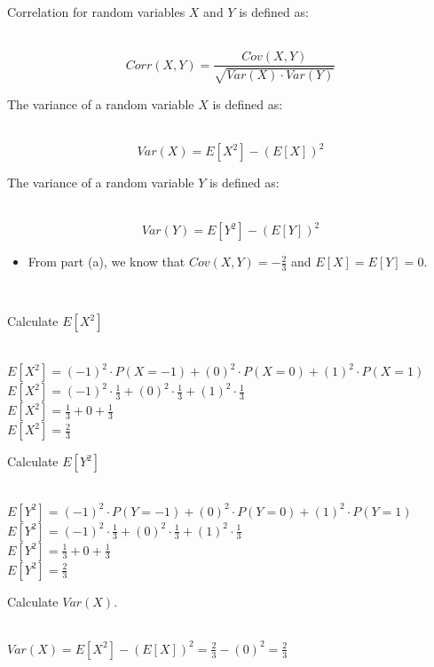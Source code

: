 \documentclass{article}
\begin{document}
\parbox{\textwidth}{Correlation for random variables $X$ and $Y$ is defined as:}\\

$$Corr(X, Y) = \frac{Cov(X, Y)}{\sqrt{Var(X) \cdot Var(Y)}}$$

\parbox{\textwidth}{The variance of a random variable $X$ is defined as:}\\

$$Var(X) = E[X^2] - (E[X])^2$$

\parbox{\textwidth}{The variance of a random variable $Y$ is defined as:}\\

$$Var(Y) = E[Y^2] - (E[Y])^2$$

\begin{itemize}
  \item \parbox{\textwidth}{From part (a), we know that $Cov(X,Y) = -\frac{2}{3}$ and $E[X] = E[Y] = 0$.}\\
\end{itemize}

\parbox{\textwidth}{Calculate $E[X^2]$}\\

$E[X^2] = (-1)^2 \cdot P(X = -1) + (0)^2 \cdot P(X = 0) + (1)^2 \cdot P(X = 1)$\\

$E[X^2] = (-1)^2 \cdot \frac{1}{3} + (0)^2 \cdot \frac{1}{3} + (1)^2 \cdot \frac{1}{3}$\\

$E[X^2] = \frac{1}{3} + 0 + \frac{1}{3}$\\

$E[X^2] = \frac{2}{3}$\\

\parbox{\textwidth}{Calculate $E[Y^2]$}\\

$E[Y^2] = (-1)^2 \cdot P(Y = -1) + (0)^2 \cdot P(Y= 0) + (1)^2 \cdot P(Y= 1)$\\

$E[Y^2] = (-1)^2 \cdot \frac{1}{3} + (0)^2 \cdot \frac{1}{3} + (1)^2 \cdot \frac{1}{3}$\\

$E[Y^2] = \frac{1}{3} + 0 + \frac{1}{3}$\\

$E[Y^2] = \frac{2}{3}$\\


\parbox{\textwidth}{Calculate $Var(X)$.}\\

$Var(X) = E[X^2] - (E[X])^2 = \frac{2}{3} - (0)^2 = \frac{2}{3}$\\
\end{document}
